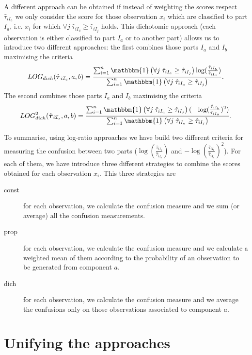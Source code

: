 \documentclass[10pt, a4paper]{article}
\newcommand{\m}[1]{\boldsymbol{#1}}
\begin{document}
A different approach can be obtained if instead of weighting the scores respect $ \hat{\tau}_{iI_a}$ we only consider the score for those observation $x_i$ which are classified to part $I_a$, i.e. $x_i$ for which $\forall j\; \hat{\tau}_{i I_{a}} \geq \hat{\tau}_{iI_j}$ holds. This dichotomic approach (each observation is either classified to part $I_a$ or to another part) allows us to introduce two different approaches: the first combines those parts $I_a$ and $I_b$ maximising the criteria
\[
LOG_{dich}( \hat{\m \tau}_{i \mathcal{I}_s}, a, b) = \frac{ \sum_{i=1}^n  \mathbbm{1}\left( \forall j\; \hat{\tau}_{i I_{a}} \geq \hat{\tau}_{iI_j} \right) \log (\frac{ \hat{\tau}_{iI_b} }{ \hat{\tau}_{iI_a} })}{\sum_{i=1}^n \mathbbm{1}\left( \forall j\; \hat{\tau}_{i I_{a}} \geq \hat{\tau}_{iI_j} \right)}.
\]
The second combines those parts $I_a$ and $I_b$ maximising the criteria
\[
LOG^2_{dich}( \hat{\m \tau}_{i \mathcal{I}_s}, a, b) = \frac{ \sum_{i=1}^n \mathbbm{1}\left( \forall j\; \hat{\tau}_{i I_{a}} \geq \hat{\tau}_{iI_j} \right) (-\log (\frac{ \hat{\tau}_{iI_b} }{ \hat{\tau}_{iI_a} })^2)}{\sum_{i=1}^n \mathbbm{1}\left( \forall j\; \hat{\tau}_{i I_{a}} \geq \hat{\tau}_{iI_j} \right)}.
\]

To summarise, using log-ratio approaches we have build two different criteria for measuring the confusion between two parts ($\log (\frac{ \hat{\tau}_{iI_b} }{ \hat{\tau}_{iI_a} })$ and $-\log (\frac{ \hat{\tau}_{iI_b} }{ \hat{\tau}_{iI_a} })^2$). For each of them, we have introduce three different strategies to combine the scores obtained for each observation $x_i$. This three strategies are
\begin{description}
\item[const] for each observation, we calculate the confusion measure and we sum (or average) all the confusion measurements.
\item[prop] for each observation, we calculate the confusion measure and we calculate a weighted mean of them according to the probability of an observation to be generated from component $a$.
\item[dich] for each observation, we calculate the confusion measure and we average the confusions only on those observations associated to component $a$.
\end{description}




\section{Unifying the approaches}
\label{confusion}
\end{document}

